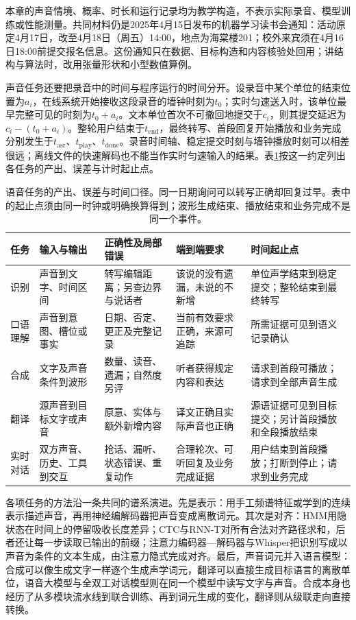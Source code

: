 本章的声音情境、概率、时长和运行记录均为教学构造，不表示实际录音、模型训练或性能测量。共同材料仍是2025年4月15日发布的机器学习读书会通知：活动原定4月17日，改至4月18日（周五）14:00，地点为海棠楼201；校外来宾须在4月16日18:00前提交报名信息。这份通知只在数据、目标构造和内容核验处回用；讲结构与算法时，改用张量形状和小型数值算例。

声音任务还要把录音中的时间与程序运行的时间分开。设录音中某个单位的结束位置为$a_i$，在线系统开始接收这段录音的墙钟时刻为$t_0$；实时匀速送入时，该单位最早完整可见的时刻为$t_0+a_i$。文本单位首次不可撤回地提交于$c_i$，则其提交延迟为$c_i-(t_0+a_i)$。整轮用户结束于$t_{\mathrm{end}}$，最终转写、首段回复开始播放和业务完成分别发生于$t_{\mathrm{asr}}$、$t_{\mathrm{play}}$、$t_{\mathrm{done}}$。录音时间轴、稳定提交时刻与墙钟播放时刻可以相差很远；离线文件的快速解码也不能当作实时匀速输入的结果。表\ref{tab:nlp-speech-contracts}按这一约定列出各任务的产出、误差与计时起止点。

\begin{table}[htbp]
  \centering
  \begin{tabularx}{\linewidth}{@{}p{15mm}p{28mm}X X p{36mm}@{}}
    \toprule
    任务 & 输入与输出 & 正确性及局部错误 & 端到端要求 & 时间起止点\\
    \midrule
    识别 & 声音到文字、时间区间 & 转写编辑距离；另查边界与说话者 & 该说的没有遗漏，未说的不新增 & 单位声学结束到稳定提交；整轮结束到最终转写\\
    口语理解 & 声音到意图、槽位或事实 & 日期、否定、更正及完整记录 & 当前有效要求正确，来源可追踪 & 所需证据可见到语义记录确认\\
    合成 & 文字及声音条件到波形 & 数量、读音、遗漏；自然度另评 & 听者获得规定内容和表达 & 请求到首段可播放；请求到全部声音生成\\
    翻译 & 源声音到目标文字或声音 & 原意、实体与额外新增内容 & 译文正确且实际声音也正确 & 源语证据可见到目标提交；另计首段播放和全段播放结束\\
    实时对话 & 双方声音、历史、工具到交互 & 抢话、漏听、状态错误、重复动作 & 合理轮次、可听回复及业务完成证据 & 用户结束到首段播放；打断到停止；请求到业务完成\\
    \bottomrule
  \end{tabularx}
  \caption{语音任务的产出、误差与时间口径。同一日期询问可以转写正确却回复过早。表中的起止点须由同一时钟或明确换算得到；波形生成结束、播放结束和业务完成不是同一个事件。}
  \label{tab:nlp-speech-contracts}
\end{table}
\FloatBarrier

各项任务的方法沿一条共同的谱系演进。先是表示：用手工频谱特征或学到的连续表示描述声音，再用神经编解码器把声音变成离散词元。其次是对齐：HMM用隐状态在时间上的停留吸收长度差异；CTC与RNN-T对所有合法对齐路径求和，后者还让每一步读取已输出的前缀；注意力编码器—解码器与Whisper把识别写成以声音为条件的文本生成，由注意力隐式完成对齐。最后，声音词元并入语言模型：合成可以像生成文字一样逐个生成声学词元，翻译可以直接生成目标语言的离散单位，语音大模型与全双工对话模型则在同一个模型中读写文字与声音。合成本身也经历了从多模块流水线到联合训练、再到词元生成的变化，翻译则从级联走向直接转换。

